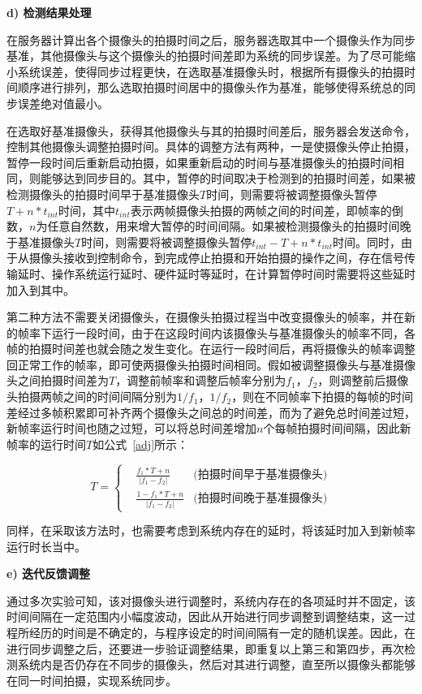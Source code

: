 \textbf{d) 检测结果处理}

在服务器计算出各个摄像头的拍摄时间之后，服务器选取其中一个摄像头作为同步基准，其他摄像头与这个摄像头的拍摄时间差即为系统的同步误差。为了尽可能缩小系统误差，使得同步过程更快，在选取基准摄像头时，根据所有摄像头的拍摄时间顺序进行排列，那么选取拍摄时间居中的摄像头作为基准，能够使得系统总的同步误差绝对值最小。

在选取好基准摄像头，获得其他摄像头与其的拍摄时间差后，服务器会发送命令，控制其他摄像头调整拍摄时间。具体的调整方法有两种，一是使摄像头停止拍摄，暂停一段时间后重新启动拍摄，如果重新启动的时间与基准摄像头的拍摄时间相同，则能够达到同步目的。其中，暂停的时间取决于检测到的拍摄时间差，如果被检测摄像头的拍摄时间早于基准摄像头$T$时间，则需要将被调整摄像头暂停$T + n * t_{int}$时间，其中$t_{int}$表示两帧摄像头拍摄的两帧之间的时间差，即帧率的倒数，$n$为任意自然数，用来增大暂停的时间间隔。如果被检测摄像头的拍摄时间晚于基准摄像头$T$时间，则需要将被调整摄像头暂停$t_{int} - T + n * t_{int}$时间。同时，由于从摄像头接收到控制命令，到完成停止拍摄和开始拍摄的操作之间，存在信号传输延时、操作系统运行延时、硬件延时等延时，在计算暂停时间时需要将这些延时加入到其中。

第二种方法不需要关闭摄像头，在摄像头拍摄过程当中改变摄像头的帧率，并在新的帧率下运行一段时间，由于在这段时间内该摄像头与基准摄像头的帧率不同，各帧的拍摄时间差也就会随之发生变化。在运行一段时间后，再将摄像头的帧率调整回正常工作的帧率，即可使两摄像头拍摄时间相同。假如被调整摄像头与基准摄像头之间拍摄时间差为$T$，调整前帧率和调整后帧率分别为$f_1，f_2$，则调整前后摄像头拍摄两帧之间的时间间隔分别为$1/f_1，1/f_2$，则在不同帧率下拍摄的每帧的时间差经过多帧积累即可补齐两个摄像头之间总的时间差，而为了避免总时间差过短，新帧率运行时间也随之过短，可以将总时间差增加$n$个每帧拍摄时间间隔，因此新帧率的运行时间$T$如公式~\ref{adj}所示：

\begin{equation}
T = \left\{
\begin{aligned}
&\frac {f_1*T + n}{|f_1- f_2|} & \text{(拍摄时间早于基准摄像头)}\\
&\frac {1- f_1*T + n}{|f_1- f_2|}  &\text{(拍摄时间晚于基准摄像头)}
\end{aligned}
\right.
  \label{adj}
\end{equation}

同样，在采取该方法时，也需要考虑到系统内存在的延时，将该延时加入到新帧率运行时长当中。

\textbf{e) 迭代反馈调整}

通过多次实验可知，该对摄像头进行调整时，系统内存在的各项延时并不固定，该时间间隔在一定范围内小幅度波动，因此从开始进行同步调整到调整结束，这一过程所经历的时间是不确定的，与程序设定的时间间隔有一定的随机误差。因此，在进行同步调整之后，还要进一步验证调整结果，即重复以上第三和第四步，再次检测系统内是否仍存在不同步的摄像头，然后对其进行调整，直至所以摄像头都能够在同一时间拍摄，实现系统同步。

